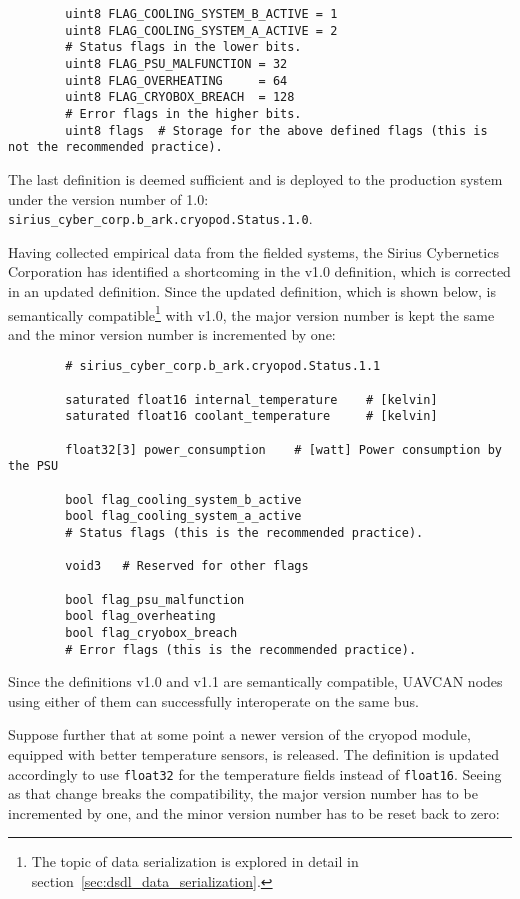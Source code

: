 \begin{remark}[breakable]
\begin{verbatim}
        uint8 FLAG_COOLING_SYSTEM_B_ACTIVE = 1
        uint8 FLAG_COOLING_SYSTEM_A_ACTIVE = 2
        # Status flags in the lower bits.
        uint8 FLAG_PSU_MALFUNCTION = 32
        uint8 FLAG_OVERHEATING     = 64
        uint8 FLAG_CRYOBOX_BREACH  = 128
        # Error flags in the higher bits.
        uint8 flags  # Storage for the above defined flags (this is not the recommended practice).
    \end{verbatim}

    The last definition is deemed sufficient and is deployed to the production system
    under the version number of 1.0: \verb|sirius_cyber_corp.b_ark.cryopod.Status.1.0|.

    Having collected empirical data from the fielded systems, the Sirius Cybernetics Corporation has
    identified a shortcoming in the v1.0 definition, which is corrected in an updated definition.
    Since the updated definition, which is shown below, is semantically compatible\footnote{%
        The topic of data serialization is explored in detail in section~\ref{sec:dsdl_data_serialization}.
    } with v1.0, the major version number is kept the same and the minor version number is incremented by one:

    \begin{verbatim}
        # sirius_cyber_corp.b_ark.cryopod.Status.1.1

        saturated float16 internal_temperature    # [kelvin]
        saturated float16 coolant_temperature     # [kelvin]

        float32[3] power_consumption    # [watt] Power consumption by the PSU

        bool flag_cooling_system_b_active
        bool flag_cooling_system_a_active
        # Status flags (this is the recommended practice).
        
        void3   # Reserved for other flags

        bool flag_psu_malfunction
        bool flag_overheating
        bool flag_cryobox_breach
        # Error flags (this is the recommended practice).
    \end{verbatim}

    Since the definitions v1.0 and v1.1 are semantically compatible,
    UAVCAN nodes using either of them can successfully interoperate on the same bus.

    Suppose further that at some point a newer version of the cryopod module,
    equipped with better temperature sensors, is released.
    The definition is updated accordingly to use \verb|float32| for the temperature fields instead of \verb|float16|.
    Seeing as that change breaks the compatibility, the major version number has to be incremented by one,
    and the minor version number has to be reset back to zero:


\end{remark}
